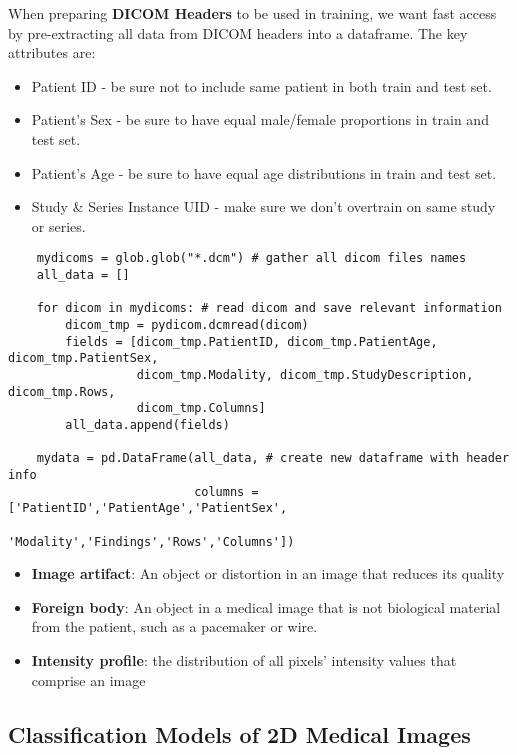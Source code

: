 \documentclass[11pt, a4paper]{article}
\begin{document}
	When preparing \textbf{DICOM Headers} to be used in training, we want fast access by pre-extracting all data from DICOM headers into a dataframe. The key attributes are:
	\begin{itemize}
		\item Patient ID - be sure not to include same patient in both train and test set.
		\item Patient's Sex - be sure to have equal male/female proportions in train and test set.
		\item Patient's Age - be sure to have equal age distributions in train and test set.
		\item Study \& Series Instance UID - make sure we don't overtrain on same study or series.
	\end{itemize}
	\begin{lstlisting}
	mydicoms = glob.glob("*.dcm") # gather all dicom files names
	all_data = []
	
	for dicom in mydicoms: # read dicom and save relevant information
		dicom_tmp = pydicom.dcmread(dicom)
		fields = [dicom_tmp.PatientID, dicom_tmp.PatientAge, dicom_tmp.PatientSex, 
		          dicom_tmp.Modality, dicom_tmp.StudyDescription, dicom_tmp.Rows, 
		          dicom_tmp.Columns]
		all_data.append(fields)
		
	mydata = pd.DataFrame(all_data, # create new dataframe with header info
	                      columns = ['PatientID','PatientAge','PatientSex',
	                                 'Modality','Findings','Rows','Columns']) \end{lstlisting}
   	\begin{itemize}
   		\item \textbf{Image artifact}: An object or distortion in an image that reduces its quality
   		\item \textbf{Foreign body}: An object in a medical image that is not biological material from the patient, such as a pacemaker or wire.
   		\item \textbf{Intensity profile}: the distribution of all pixels' intensity values that comprise an image
   	\end{itemize} \newpage


	\subsection{Classification Models of 2D Medical Images}
	
	
	
	
	
	
	
	
\end{document}
